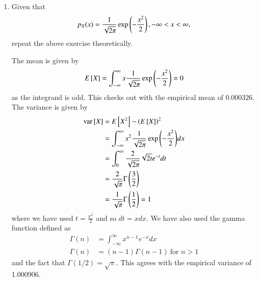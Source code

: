\documentclass[journal,12pt,twocolumn]{IEEEtran}
\renewcommand\thesection{\arabic{section}}
\begin{document}
\begin{enumerate}[label=\thesection.\arabic*
,ref=\thesection.\theenumi]
\noindent The C program can be downloaded using
\begin{lstlisting}
$ wget https://raw.githubusercontent.com/goats-9/ai1110-assignments/master/manual/codes/2_4.c
\end{lstlisting}
and compiled and executed with the following commands
\begin{lstlisting}
$ gcc 2_4.c -lm -Wall -g
$ ./a.out
\end{lstlisting}
The calculated mean is 0.000326 and the calculated variance is 1.000906.

\item Given that 
\begin{align}
p_{X}(x) = \frac{1}{\sqrt{2\pi}}\exp\left(-\frac{x^2}{2}\right), -\infty < x < \infty,
\end{align}
repeat the above exercise theoretically.

\solution
The mean is given by
		\begin{align}
			E{}\left[X\right] = \int_{-\infty}^{\infty}x\frac{1}{\sqrt{2\pi}}\exp{\left(-\frac{x^2}{2}\right)} = 0
			\label{eq:gau-mean}
		\end{align}
as the integrand is odd. This checks out with the empirical mean of 0.000326. The variance is given by
		\begin{align}
			\text{var}{}\left[X\right] &= E{}\left[X^2\right] - \left(E{}\left[X\right]\right)^2 \\
			&= \int_{-\infty}^{\infty}x^2\frac{1}{\sqrt{2\pi}}\exp{\left(-\frac{x^2}{2}\right)}dx \label{eq:int} \\
			&= \int_{0}^{\infty}\frac{2}{\sqrt{2\pi}}\sqrt{2t}e^{-t}dt \\
			&= \frac{2}{\sqrt{\pi}}\Gamma\left(\frac{3}{2}\right) \\
			&= \frac{1}{\sqrt{\pi}}\Gamma\left(\frac{1}{2}\right) = 1
			\label{eq:gau-var}
		\end{align}
where we have used $t = \frac{x^2}{2}$ and so $dt = xdx$. We have also used the gamma function defined as
\begin{align}
	\Gamma(n) &= \int_{-\infty}^{\infty}x^{n - 1}e^{-x}dx \\
	\Gamma(n) &= (n - 1)\Gamma(n - 1)\ \text{for $n > 1$}
\end{align}
and the fact that $\Gamma(1/2) = \sqrt{\pi}$.
This agrees with the empirical variance of 1.000906.
%
\end{enumerate}
\end{document}
